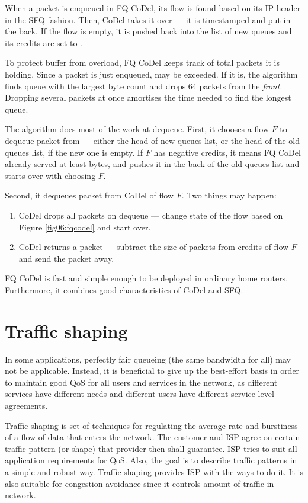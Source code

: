 When a packet is enqueued in FQ CoDel, its flow is found based on its IP header in the SFQ fashion. Then, CoDel takes it over --- it is timestamped and put in the back. If the flow is empty, it is pushed back into the list of new queues and its credits are set to .

To protect buffer from overload, FQ CoDel keeps track of total packets it is holding. Since a packet is just enqueued,  may be exceeded. If it is, the algorithm finds queue with the largest byte count and drops 64 packets from the \textit{front}. Dropping several packets at once amortises the time needed to find the longest queue.

The algorithm does most of the work at dequeue. First, it chooses a flow $F$ to dequeue packet from --- either the head of new queues list, or the head of the old queues list, if the new one is empty. If $F$ has negative credits, it means FQ CoDel already served at least  bytes, and pushes it in the back of the old queues list and starts over with choosing $F$.

Second, it dequeues packet from CoDel of flow $F$. Two things may happen:
\begin{enumerate}
	\item CoDel drops all packets on dequeue --- change state of the flow based on Figure \ref{fig06:fqcodel} and start over.
	\item CoDel returns a packet --- subtract the size of packets from credits of flow $F$ and send the packet away.
\end{enumerate}

FQ CoDel is fast and simple enough to be deployed in ordinary home routers. Furthermore, it combines good characteristics of CoDel and SFQ.

\section{Traffic shaping}

In some applications, perfectly fair queueing (the same bandwidth for all) may not be applicable. Instead, it is beneficial to give up the best-effort basis in order to maintain good QoS for all users and services in the network, as different services have different needs and different users have different service level agreements. 

Traffic shaping is set of techniques for regulating the average rate and burstiness of a flow of data that enters the network. The customer and ISP agree on certain traffic pattern (or shape) that provider then shall guarantee. ISP tries to suit all application requirements for QoS. Also, the goal is to describe traffic patterns in a simple and robust way. Traffic shaping provides ISP with the ways to do it. It is also suitable for congestion avoidance since it controls amount of traffic in network.

